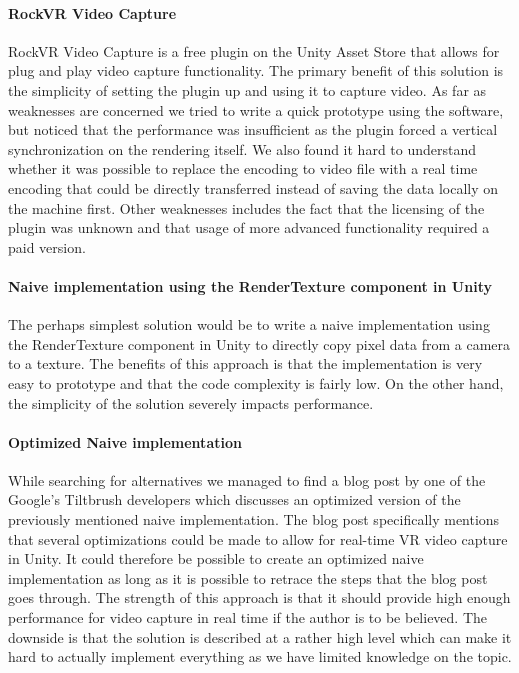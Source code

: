 \paragraph{RockVR Video Capture}
RockVR Video Capture\cite{unity_asset_store_rockvr} is a free plugin on the Unity Asset Store that allows for plug and play video capture functionality. The primary benefit of this solution is the simplicity of setting the plugin up and using it to capture video. As far as weaknesses are concerned we tried to write a quick prototype using the software, but noticed that the performance was insufficient as the plugin forced a vertical synchronization on the rendering itself. We also found it hard to understand whether it was possible to replace the encoding to video file with a real time encoding that could be directly transferred instead of saving the data locally on the machine first. Other weaknesses includes the fact that the licensing of the plugin was unknown and that usage of more advanced functionality required a paid version. 

\paragraph{Naive implementation using the RenderTexture component in Unity}
The perhaps simplest solution would be to write a naive implementation using the RenderTexture\cite{unity_renderTexture} component in Unity to directly copy pixel data from a camera to a texture. The benefits of this approach is that the implementation is very easy to prototype and that the code complexity is fairly low. On the other hand, the simplicity of the solution severely impacts performance.  

\paragraph{Optimized Naive implementation}
While searching for alternatives we managed to find a blog post\cite{google_vrCaptureBlog} by one of the Google's Tiltbrush developers which discusses an optimized version of the previously mentioned naive implementation. The blog post specifically mentions that several optimizations could be made to allow for real-time VR video capture in Unity. It could therefore be possible to create an optimized naive implementation as long as it is possible to retrace the steps that the blog post goes through. The strength of this approach is that it should provide high enough performance for video capture in real time if the author is to be believed. The downside is that the solution is described at a rather high level which can make it hard to actually implement everything as we have limited knowledge on the topic. 


